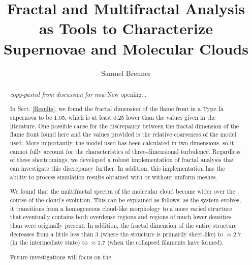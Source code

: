 \documentclass[iop]{emulateapj}
\begin{document}
%
\title{Fractal and Multifractal Analysis as Tools to Characterize Supernovae and Molecular Clouds}
%
\author{Samuel Brenner}
%
%
%
%
%
\begin{abstract}
\textit{copy-pasted from discussion for now} New opening...

In Sect. \ref{Results}, we found the fractal dimension of the flame front in a Type Ia supernova to be 1.05, which is at least 0.25 lower than the values given in the literature. One possible cause for the discrepancy between the fractal dimension of the flame front found here and the values provided is the relative coarseness of the model used. More importantly, the model used has been calculated in two dimensions, so it cannot fully account for the characteristics of three-dimensional turbulence. Regardless of these shortcomings, we developed a robust implementation of fractal analysis that can investigate this discrepancy further. In addition, this implementation has the ability to process simulation results obtained with or without uniform meshes.
 
We found that the multifractal spectra of the molecular cloud become wider over the course of the cloud's evolution. This can be explained as follows: as the system evolves, it transitions from a homogeneous cloud-like morphology to a more varied structure that eventually contains both overdense regions and regions of much lower densities than were originally present. In addition, the fractal dimension of the entire structure decreases from a little less than 3 (where the structure is primarily sheet-like) to $\approx 2.7$ (in the intermediate state) to $\approx 1.7$ (when the collapsed filaments have formed).

Future investigations will focus on the 
\end{abstract}
%
%
%
%
%
%
\end{document}
